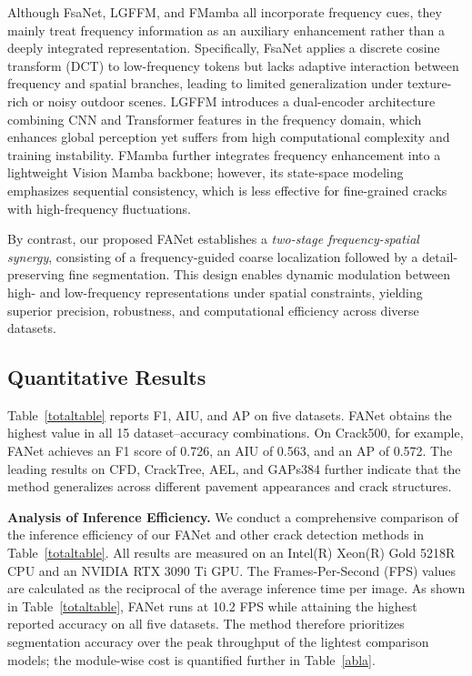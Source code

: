 \documentclass[journal]{IEEEtran}
\begin{document}
Although FsaNet, LGFFM, and FMamba all incorporate frequency cues, they mainly treat frequency information as an auxiliary enhancement rather than a deeply integrated representation. 
Specifically, FsaNet applies a discrete cosine transform (DCT) to low-frequency tokens but lacks adaptive interaction between frequency and spatial branches, leading to limited generalization under texture-rich or noisy outdoor scenes. 
LGFFM introduces a dual-encoder architecture combining CNN and Transformer features in the frequency domain, which enhances global perception yet suffers from high computational complexity and training instability. 
FMamba further integrates frequency enhancement into a lightweight Vision Mamba backbone; however, its state-space modeling emphasizes sequential consistency, which is less effective for fine-grained cracks with high-frequency fluctuations.



By contrast, our proposed FANet establishes a \emph{two-stage frequency-spatial synergy}, consisting of a frequency-guided coarse localization followed by a detail-preserving fine segmentation. 
This design enables dynamic modulation between high- and low-frequency representations under spatial constraints, yielding superior precision, robustness, and computational efficiency across diverse datasets.



%
%



\subsection{Quantitative Results}

Table~\ref{totaltable} reports F1, AIU, and AP on five datasets. FANet obtains the highest value in all 15 dataset--accuracy combinations. On Crack500, for example, FANet achieves an F1 score of 0.726, an AIU of 0.563, and an AP of 0.572. The leading results on CFD, CrackTree, AEL, and GAPs384 further indicate that the method generalizes across different pavement appearances and crack structures.






\textbf{Analysis of Inference Efficiency.}  
We conduct a comprehensive comparison of the inference efficiency of our FANet and other crack detection methods in Table~\ref{totaltable}.  
All results are measured on an Intel(R) Xeon(R) Gold 5218R CPU and an NVIDIA RTX 3090 Ti GPU.  
The Frames-Per-Second (FPS) values are calculated as the reciprocal of the average inference time per image.  
As shown in Table~\ref{totaltable}, FANet runs at 10.2 FPS while attaining the highest reported accuracy on all five datasets. The method therefore prioritizes segmentation accuracy over the peak throughput of the lightest comparison models; the module-wise cost is quantified further in Table~\ref{abla}.
\end{document}
